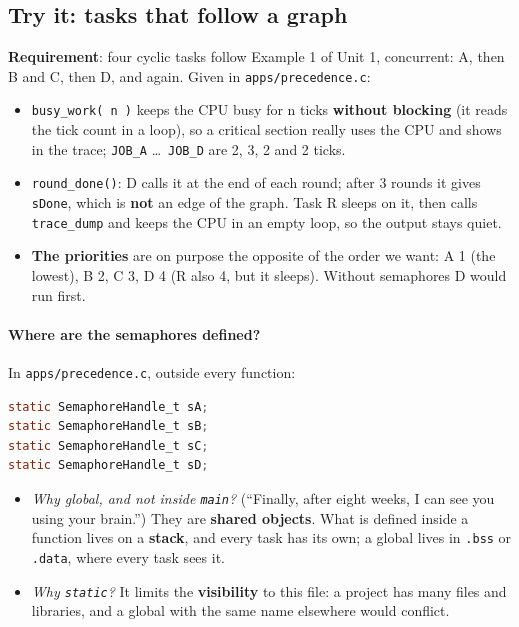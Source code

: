 \subsection{Try it: tasks that follow a graph}
\textbf{Requirement}: four cyclic tasks follow Example 1 of Unit 1, concurrent: A, then B and C, then D, and again. Given in \texttt{apps/precedence.c}:
\begin{itemize}
    \item \texttt{busy\_work( n )} keeps the CPU busy for n ticks \textbf{without blocking} (it reads the tick count in a loop), so a critical section really uses the CPU and shows in the trace; \texttt{JOB\_A} \dots\ \texttt{JOB\_D} are 2, 3, 2 and 2 ticks.
    \item \texttt{round\_done()}: D calls it at the end of each round; after 3 rounds it gives \texttt{sDone}, which is \textbf{not} an edge of the graph. Task R sleeps on it, then calls \texttt{trace\_dump} and keeps the CPU in an empty loop, so the output stays quiet.
    \item \textbf{The priorities} are on purpose the opposite of the order we want: A 1 (the lowest), B 2, C 3, D 4 (R also 4, but it sleeps). Without semaphores D would run first.
\end{itemize}

\paragraph{Where are the semaphores defined?} In \texttt{apps/precedence.c}, outside every function:
\begin{lstlisting}[language=C, showstringspaces=false, basicstyle=\ttfamily\footnotesize]
static SemaphoreHandle_t sA;
static SemaphoreHandle_t sB;
static SemaphoreHandle_t sC;
static SemaphoreHandle_t sD;
\end{lstlisting}
\begin{itemize}
    \item \emph{Why global, and not inside \texttt{main}?} (``Finally, after eight weeks, I can see you using your brain.'') They are \textbf{shared objects}. What is defined inside a function lives on a \textbf{stack}, and every task has its own; a global lives in \texttt{.bss} or \texttt{.data}, where every task sees it.
    \item \emph{Why \texttt{static}?} It limits the \textbf{visibility} to this file: a project has many files and libraries, and a global with the same name elsewhere would conflict.
\end{itemize}

